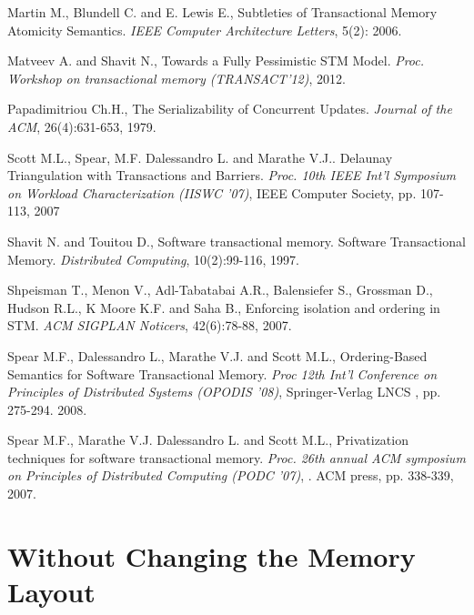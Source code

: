 \documentclass[11pt,letterpaper]{article}
\begin{document}
{\begin{thebibliography}{guerraoui08}
 Martin M.,  Blundell C.  and E. Lewis E.,
 Subtleties of Transactional Memory Atomicity Semantics. 
{\it IEEE Computer Architecture  Letters},  5(2):  2006.


Matveev A. and  Shavit N.,
Towards a Fully Pessimistic STM Model. 
{\it Proc. Workshop on transactional memory (TRANSACT'12)}, 2012.



Papadimitriou Ch.H., 
The Serializability of Concurrent Updates. 
{\it Journal of the ACM},  26(4):631-653, 1979. 


 Scott M.L.,  Spear, M.F. Dalessandro L.  and  Marathe V.J..
 Delaunay Triangulation with Transactions and Barriers. 
{\it Proc.  10th IEEE Int'l Symposium on Workload Characterization (IISWC '07)},
 IEEE Computer Society, pp. 107-113, 2007





 Shavit N. and  Touitou D.,
 Software transactional memory. 
Software Transactional Memory. 
{\it Distributed  Computing}, 10(2):99-116, 1997. 


 Shpeisman T.,  Menon V.,  Adl-Tabatabai A.R.,  Balensiefer  S.,  Grossman D.,
 Hudson R.L., K Moore K.F.  and  Saha B., 
Enforcing isolation and ordering in STM. 
{\it ACM  SIGPLAN Noticers}, 42(6):78-88,  2007.





Spear M.F.,  Dalessandro L.,  Marathe V.J. and  Scott M.L., 
Ordering-Based Semantics for Software Transactional Memory. 
{\it Proc  12th Int'l Conference on Principles of Distributed Systems 
(OPODIS '08)},  Springer-Verlag LNCS , pp. 275-294. 2008. 



Spear M.F.,  Marathe V.J. Dalessandro L. and  Scott M.L., 
Privatization techniques for software transactional memory. 
{\it Proc. 26th  annual ACM symposium on Principles of Distributed Computing 
(PODC '07)}, . ACM press, pp.  338-339, 2007.



\end{thebibliography}

}

\appendix
\section{Without Changing the Memory Layout}
\end{document}
